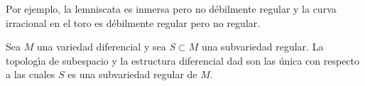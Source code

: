 \begin{center}
\end{center}
Por ejemplo, la lemniscata es inmersa pero no d\'{e}bilmente regular y
la curva irracional en el toro es d\'{e}bilmente regular pero no
regular.

\begin{teoUnicidadDeLaEstructuraRegular}\label{thm:unicidaddelaestructuraregular}
	Sea $M$ una variedad diferencial y sea $S\subset M$ una subvariedad
	regular. La topolog\'{\i}a de subespacio y la estructura diferencial
	dad son las \'{u}nica con respecto a las cuales $S$ es una
	subvariedad regular de $M$.
\end{teoUnicidadDeLaEstructuraRegular}

